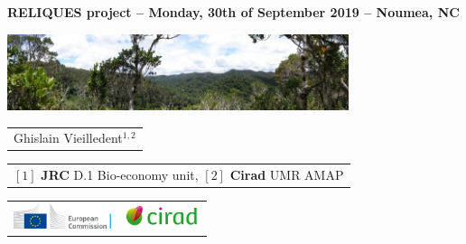 {

  \begin{frame}
    \begin{center}
        \small{\textbf{RELIQUES project -- Monday, 30th of September 2019 -- Noumea, NC}}
    \end{center}
    \vspace{-0.5cm}
    \titlepage %
    \vspace{-2.5cm}
    \begin{center}
      \includegraphics[width=10cm]{figs/Banniere.png}
    \end{center}
    \begin{center}

        \begin{tabular}{c}
          Ghislain Vieilledent$^{1,2}$
        \end{tabular}

      \vspace{0.25cm}

      {\small
        \begin{tabular}{c}
          $[1]$ \textbf{JRC} D.1 Bio-economy unit,
          $[2]$ \textbf{Cirad} UMR AMAP
        \end{tabular}
      }

      \vspace{0.25cm}

      \begin{tabular}{C{3cm}C{3cm}}
        \includegraphics[height=0.75cm]{figs/Logo-JRC.jpg} &
        \includegraphics[height=0.75cm]{figs/Logo-Cirad.png}\\
      \end{tabular}

    \end{center}
    
  \end{frame}
}
\setcounter{framenumber}{0}

